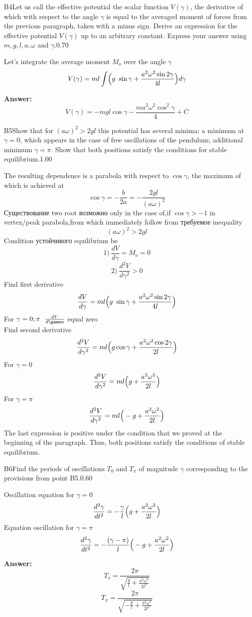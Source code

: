 \documentclass[11pt,a4paper]{article}
\begin{document}
\begin{solcard}{B4}{Let us call the effective potential the scalar function $V(\gamma)$, the derivative of which with respect to the angle $\gamma$ is equal to the averaged moment of forces from the previous paragraph, taken with a minus sign. Derive an expression for the effective potential $V(\gamma)$ up to an arbitrary constant. Express your answer using $m, g, l, a, \omega$ and $\gamma$.}{0.70}

Let's integrate the average moment $M_o$ over the angle $\gamma$ $$V(\gamma)=ml\int \Bigr(g~\sin{\gamma}+\frac{a^2{\omega}^2\sin{2\gamma}}{4l}\Bigl)d{\gamma} $$

\par\smallskip\noindent\textbf{Answer:} $$V(\gamma)=-mgl\cos{\gamma}-\frac{ma^2{\omega}^2\cos^2{\gamma}}{4}+C $$
\end{solcard}

\begin{solcard}{B5}{Show that for $(a\omega)^2>2gl$ this potential has several minima: a minimum at $\gamma=0$, which appears in the case of free oscillations of the pendulum; additional minimum $\gamma=\pi$. Show that both positions satisfy the conditions for stable equilibrium.}{1.00}

The resulting dependence is a parabola with respect to $\cos{\gamma}$, the maximum of which is achieved at $$\cos{\gamma}=-\frac{b}{2a}=-\frac{2gl}{({a\omega})^2} $$ Существование two root возможно only in the case of,if $\cos{\gamma} > -1$ in vertex/peak parabola,from which immediately follow from требуемое inequality $$(a{\omega})^2>2gl $$ Condition устойчивого equilibrium be $$1)~\frac{dV}{d{\gamma}}=M_o=0 $$ $$2)~\frac{d^2V}{d{\gamma}^2}>0 $$ Find first derivative $$\frac{dV}{d{\gamma}}=ml\Bigr(g~\sin{\gamma}+\frac{a^2{\omega}^2\sin{2\gamma}}{4l}\Bigl) $$ For $\gamma=0;\pi~~\frac{dV}{d\gamm a}$ equal zero $$ $$ Find second derivative $$\frac{d^2V}{d{\gamma}^2}=ml\Bigr(g\cos{\gamma}+\frac{a^2{\omega}^2\cos{2\gamma}}{2l}\Bigl) $$ For $\gamma=0$ $$\frac{d^2V}{d{\gamma}^2}=ml\Bigr(g+\frac{a^2{\omega}^2}{2l}\Bigl) $$ For $\gamma=\pi$ $$\frac{d^2V}{d{\gamma}^2}=ml\Bigr(-g+\frac{a^2{\omega}^2}{2l}\Bigl) $$ The last expression is positive under the condition that we proved at the beginning of the paragraph. Thus, both positions satisfy the conditions of stable equilibrium.

\end{solcard}

\begin{solcard}{B6}{Find the periods of oscillations $T_0$ and $T_\pi$ of magnitude $\gamma$ corresponding to the provisions from point B5.}{0.60}

Oscillation equation for $\gamma=0$ $$\frac{d^2{\gamma}}{dt^2}=-\frac{\gamma}{l}\Bigr(g+\frac{a^2{\omega}^2}{2l}\Bigl) $$Equation oscillation for $\gamma=\pi$ $$\frac{d^2{\gamma}}{dt^2}=-\frac{(\gamma-\pi)}{l}\Bigr(-g+\frac{a^2{\omega}^2}{2l}\Bigl) $$

\par\smallskip\noindent\textbf{Answer:} $$T_o=\frac{2\pi}{\sqrt{\frac{g}{l}+\frac{a^2{\omega}^2}{2l^2}}} $$ $$T_{\pi}=\frac{2\pi}{\sqrt{-\frac{g}{l}+\frac{a^2{\omega}^2}{2l^2}}} $$
\end{solcard}
\end{document}
